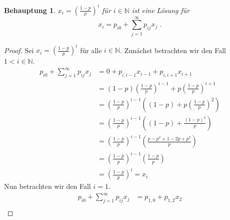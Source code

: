 \documentclass[a4paper]{scrartcl}
\newtheorem*{behaupt}{Behauptung}
\newcommand{\N}{\mathbb{N}}
\def \blattnr {3}
\begin{document}
\begin{enumerate}[label=\bfseries \blattnr.\arabic*]
\begin{enumerate}[label=\alph*)]
                \begin{behaupt}
                    $x_i = \left(\frac{1-p}{p}\right)^i$ für $i \in \N$ ist
                    eine Lösung für
                    \begin{equation*}
                        x_i = p_{i0} + \sum_{j=1}^\infty p_{ij} x_j
                        \text{ .}
                    \end{equation*}
                \end{behaupt}
                \begin{proof}
                    Sei $x_i = \left(\frac{1-p}{p}\right)^i$ für alle $i \in
                    \N$.  Zunächst betrachten wir den Fall $1 < i \in \N$.
                    \begin{equation*}
                        \begin{split}
                            p_{i0} + \sum_{j=1}^\infty p_{ij} x_j
                            &= 0 + p_{i,i-1} x_{i-1} + p_{i,i+1} x_{i+1} \\
                            &= (1-p) \left( \frac{1-p}{p} \right)^{i-1} +
                                p \left( \frac{1-p}{p} \right)^{i+1} \\
                            &= \left( \frac{1-p}{p} \right)^{i-1}
                                \left( (1-p) + 
                                p \left( \frac{1-p}{p} \right)^{2} \right) \\
                            &= \left( \frac{1-p}{p} \right)^{i-1}
                                \left( (1-p) + \frac{(1-p)^2}{p} \right) \\
                            &= \left( \frac{1-p}{p} \right)^{i-1}
                                \left( \frac{p -p^2 +1 -2p +p^2}{p} \right) \\
                            &= \left( \frac{1-p}{p} \right)^{i-1}
                                \left( \frac{1-p}{p} \right) \\
                            &= \left( \frac{1-p}{p} \right)^i = x_i
                        \end{split}
                    \end{equation*}
                    Nun betrachten wir den Fall $i = 1$.
                    \begin{equation*}
                        \begin{split}
                            p_{i0} + \sum_{j=1}^\infty p_{ij} x_j
                            &= p_{1,0} + p_{1,2} x_{2} \\

\end{split}
\end{equation*}
\end{proof}
\end{enumerate}
\end{enumerate}
\end{document}
